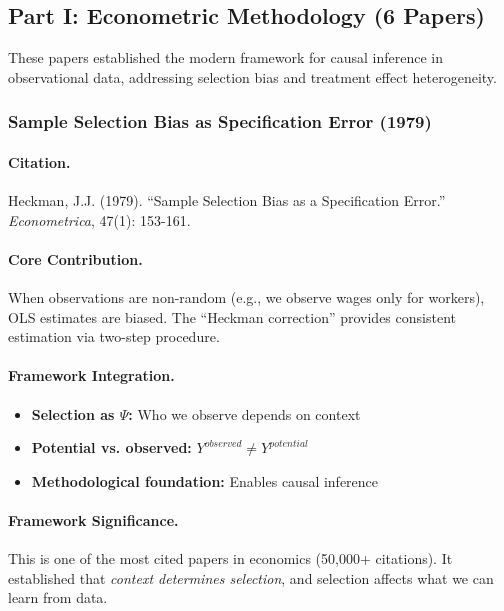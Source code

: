 \subsection{Part I: Econometric Methodology (6 Papers)}

These papers established the modern framework for causal inference in
observational data, addressing selection bias and treatment effect heterogeneity.

\subsubsection{Sample Selection Bias as Specification Error (1979)}

\paragraph{Citation.}
Heckman, J.J. (1979). ``Sample Selection Bias as a Specification Error.''
\emph{Econometrica}, 47(1): 153-161.

\paragraph{Core Contribution.}
When observations are non-random (e.g., we observe wages only for workers),
OLS estimates are biased. The ``Heckman correction'' provides consistent
estimation via two-step procedure.

\paragraph{Framework Integration.}
\begin{itemize}
  \item \textbf{Selection as $\Psi$:} Who we observe depends on context
  \item \textbf{Potential vs. observed:} $Y^{observed} \neq Y^{potential}$
  \item \textbf{Methodological foundation:} Enables causal inference
\end{itemize}

\paragraph{Framework Significance.}
This is one of the most cited papers in economics (50,000+ citations).
It established that \emph{context determines selection}, and selection
affects what we can learn from data.

